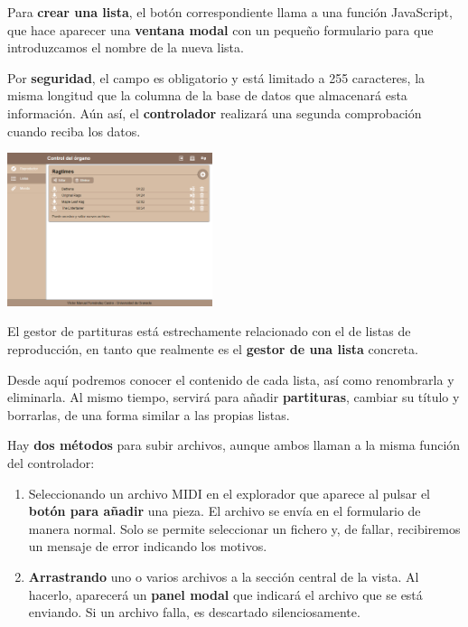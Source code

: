 \documentclass[10pt,a4paper]{article}
\begin{document}
	Para \textbf{crear una lista}, el botón correspondiente llama a una función JavaScript, que hace aparecer una \textbf{ventana modal} con un pequeño formulario para que introduzcamos el nombre de la nueva lista.
	
	Por \textbf{seguridad}, el campo es obligatorio y está limitado a 255 caracteres, la misma longitud que la columna de la base de datos que almacenará esta información. Aún así, el \textbf{controlador} realizará una segunda comprobación cuando reciba los datos.
	
	\begin{multicols}{2}
		\noindent
		\begin{center}
			\includegraphics[width=0.45\textwidth]{images/cap_piezas} 
		\end{center}
		\columnbreak
		El gestor de partituras está estrechamente relacionado con el de listas de reproducción, en tanto que realmente es el \textbf{gestor de una lista} concreta. 
		
		Desde aquí podremos conocer el contenido de cada lista, así como renombrarla y eliminarla. Al mismo tiempo, servirá para añadir \textbf{partituras}, cambiar su título y borrarlas, de una forma similar a las propias listas.
	\end{multicols}
	
	Hay \textbf{dos métodos} para subir archivos, aunque ambos llaman a la misma función del controlador:
	
	\begin{enumerate}
		\item Seleccionando un archivo MIDI en el explorador que aparece al pulsar el\textbf{ botón para añadir} una pieza. El archivo se envía en el formulario de manera normal. Solo se permite seleccionar un fichero y, de fallar, recibiremos un mensaje de error indicando los motivos.
		
		\item \textbf{Arrastrando} uno o varios archivos a la sección central de la vista. Al hacerlo, aparecerá un \textbf{panel modal} que indicará el archivo que se está enviando. Si un archivo falla, es descartado silenciosamente.
	\end{enumerate}
	
\end{document}
